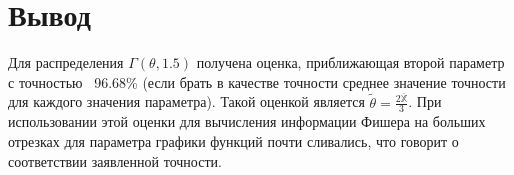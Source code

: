 \documentclass{article}
\begin{document}
\section{Вывод}

Для распределения $\Gamma(\theta, 1.5)$ получена оценка, приближающая второй параметр с точностью ~96.68\% (если брать в качестве точности среднее значение точности для каждого значения параметра). Такой оценкой является $\widetilde{\theta} = \frac{2\overline{\mathbb{X}}}{3}$. При использовании этой оценки для вычисления информации Фишера на больших отрезках для параметра графики функций почти сливались, что говорит о соответствии заявленной точности.
\end{document}
